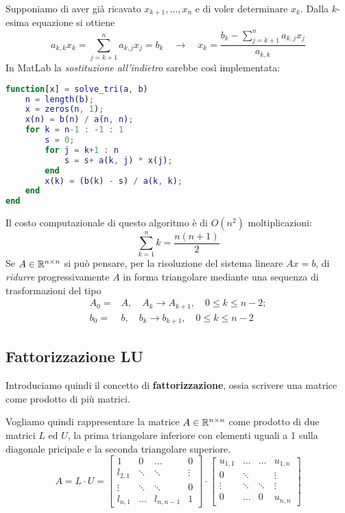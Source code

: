 Supponiamo di aver già ricavato $x_{k+1}, \dots, x_n$ e di voler determinare $x_k$. Dalla $k$-esima equazione si
ottiene
\[
	a_{k,k} x_k = \sum_{j=k+1}^n a_{k,j} x_j = b_k \quad \to \quad
	x_k = \frac{b_k - \displaystyle\sum_{j=k+1}^n a_{k,j} x_j}{a_{k,k}}
\]
In MatLab la \emph{sostituzione all'indietro} sarebbe così implementata:
\begin{lstlisting}[language=matlab]
function[x] = solve_tri(a, b)
	n = length(b);
	x = zeros(n, 1);
	x(n) = b(n) / a(n, n);
	for k = n-1 : -1 : 1
		s = 0;
		for j = k+1 : n
			s = s+ a(k, j) * x(j);
		end
		x(k) = (b(k) - s) / a(k, k);
	end
end
\end{lstlisting}
Il costo computazionale di questo algoritmo è di $O(n^2)$ moltiplicazioni:
\[ \sum_{k=1}^n k = \frac{n (n + 1)}{2} \]
Se $A \in \mathbb{R}^{n \times n}$ si può pensare, per la risoluzione del sistema lineare $A x = b$, di \emph{ridurre}
progressivamente $A$ in forma triangolare mediante una sequenza di trasformazioni del tipo
\begin{align*}
	A_0 = & A, \quad A_k \to A_{k+1}, \quad 0 \leq k \leq n - 2; \\
	b_0 = & b, \quad b_k \to b_{k+1}, \quad 0 \leq k \leq n - 2
\end{align*}

\subsection{Fattorizzazione LU}
Introduciamo quindi il concetto di \textbf{fattorizzazione}, ossia scrivere una matrice come prodotto di più
matrici.

Vogliamo quindi rappresentare la matrice $A \in \mathbb{R}^{n \times n}$ come prodotto di due matrici $L$ ed $U$, la
prima triangolare inferiore con elementi uguali a 1 sulla diagonale pricipale e la seconda triangolare superiore.
\[
	A = L \cdot U = \begin{bmatrix}
		1       & 0      & \dots     & 0      \\
		l_{2,1} & \ddots & \ddots    & \vdots \\
		\vdots  & \ddots & \ddots    & 0      \\
		l_{n,1} & \dots  & l_{n,n-1} & 1
	\end{bmatrix} \cdot
	\begin{bmatrix}
		u_{1,1} & \dots  & \dots  & u_{1,n} \\
		0       & \ddots &        & \vdots  \\
		\vdots  & \ddots & \ddots & \vdots  \\
		0       & \dots  & 0      & u_{n,n}
	\end{bmatrix}
\]

